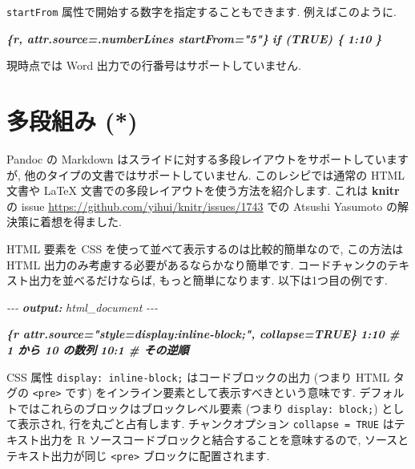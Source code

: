 \documentclass[
  11pt,
]{bxjsreport}
\newenvironment{Shaded}{\begin{snugshade}}{\end{snugshade}}
\newcommand{\AnnotationTok}[1]{\textcolor[rgb]{0.56,0.35,0.01}{\textbf{\textit{#1}}}}
\newcommand{\CommentTok}[1]{\textcolor[rgb]{0.56,0.35,0.01}{\textit{#1}}}
\newcommand{\InformationTok}[1]{\textcolor[rgb]{0.56,0.35,0.01}{\textbf{\textit{#1}}}}
\begin{document}
\texttt{startFrom} 属性で開始する数字を指定することもできます. 例えばこのように.

\begin{Shaded}
\begin{Highlighting}[]
\InformationTok{\textasciigrave{}\textasciigrave{}\textasciigrave{}\{r, attr.source=\textquotesingle{}.numberLines startFrom="5"\textquotesingle{}\}}
\InformationTok{if (TRUE) \{}
\InformationTok{  1:10}
\InformationTok{\}}
\InformationTok{\textasciigrave{}\textasciigrave{}\textasciigrave{}}
\end{Highlighting}
\end{Shaded}

現時点では Word 出力での行番号はサポートしていません.

\hypertarget{multi-column}{%
\section{多段組み (*)}\label{multi-column}}

Pandoc の Markdown はスライドに対する多段レイアウトをサポートしていますが, 他のタイプの文書ではサポートしていません. このレシピでは通常の HTML 文書や LaTeX 文書での多段レイアウトを使う方法を紹介します. これは \textbf{knitr} の issue \url{https://github.com/yihui/knitr/issues/1743} での Atsushi Yasumoto の解決策に着想を得ました.

HTML 要素を CSS を使って並べて表示するのは比較的簡単なので, この方法は HTML 出力のみ考慮する必要があるならかなり簡単です. コードチャンクのテキスト出力を並べるだけならば, もっと簡単になります. 以下は1つ目の例です.

\begin{Shaded}
\begin{Highlighting}[]
\CommentTok{{-}{-}{-}}
\AnnotationTok{output:}\CommentTok{ html\_document}
\CommentTok{{-}{-}{-}}

\InformationTok{\textasciigrave{}\textasciigrave{}\textasciigrave{}\{r attr.source="style=\textquotesingle{}display:inline{-}block;\textquotesingle{}", collapse=TRUE\}}
\InformationTok{1:10  \# 1 から 10 の数列}
\InformationTok{10:1  \# その逆順}
\InformationTok{\textasciigrave{}\textasciigrave{}\textasciigrave{}}
\end{Highlighting}
\end{Shaded}

CSS 属性 \texttt{display: inline-block;}  はコードブロックの出力 (つまり HTML タグの \texttt{\textless{}pre\textgreater{}} です) をインライン要素として表示すべきという意味です. デフォルトではこれらのブロックはブロックレベル要素 (つまり \texttt{display: block;}) として表示され, 行を丸ごと占有します. チャンクオプション \texttt{collapse = TRUE} はテキスト出力を R ソースコードブロックと結合することを意味するので, ソースとテキスト出力が同じ \texttt{\textless{}pre\textgreater{}} ブロックに配置されます.
\end{document}
